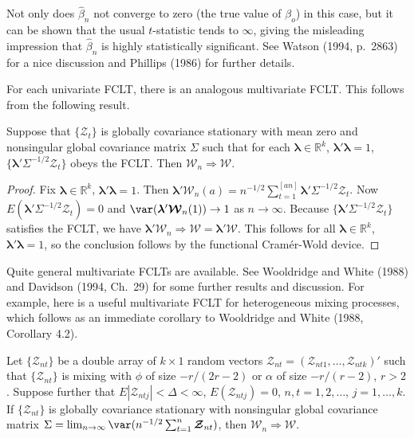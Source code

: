 Not only does $\hat{\beta}_n$ not converge to zero (the true value of $\beta_o$) in this case, but it can be shown that the usual $t$-statistic tends to $\infty$, giving the misleading impression that $\hat{\beta}_n$ is highly statistically significant. See Watson (1994, p.\ 2863) for a nice discussion and Phillips (1986) for further details.

For each univariate FCLT, there is an analogous multivariate FCLT. This follows from the following result.

\begin{theorem}\label{thm:multivariate-fclt}
Suppose that $\{\boldsymbol{\mathcal{Z}}_t\}$ is globally covariance stationary with mean zero and nonsingular global covariance matrix $\Sigma$ such that for each $\boldsymbol{\lambda} \in \mathbb{R}^k$, $\boldsymbol{\lambda}'\boldsymbol{\lambda} = 1$, $\{\boldsymbol{\lambda}'\Sigma^{-1/2}\boldsymbol{\mathcal{Z}}_t\}$ obeys the FCLT. Then $\boldsymbol{\mathcal{W}}_n \Rightarrow \boldsymbol{\mathcal{W}}$.
\end{theorem}

\begin{proof}
Fix $\boldsymbol{\lambda} \in \mathbb{R}^k$, $\boldsymbol{\lambda}'\boldsymbol{\lambda} = 1$. Then $\boldsymbol{\lambda}'\boldsymbol{\mathcal{W}}_n(a) = n^{-1/2}\sum_{t=1}^{[an]} \boldsymbol{\lambda}'\Sigma^{-1/2}\boldsymbol{\mathcal{Z}}_t$. Now $E(\boldsymbol{\lambda}'\Sigma^{-1/2}\boldsymbol{\mathcal{Z}}_t) = 0$ and $\var(\boldsymbol{\lambda}'\boldsymbol{\mathcal{W}}_n(1)) \to 1$ as $n \to \infty$. Because $\{\boldsymbol{\lambda}'\Sigma^{-1/2}\boldsymbol{\mathcal{Z}}_t\}$ satisfies the FCLT, we have $\boldsymbol{\lambda}'\boldsymbol{\mathcal{W}}_n \Rightarrow \mathcal{W} = \boldsymbol{\lambda}'\boldsymbol{\mathcal{W}}$. This follows for all $\boldsymbol{\lambda} \in \mathbb{R}^k$, $\boldsymbol{\lambda}'\boldsymbol{\lambda} = 1$, so the conclusion follows by the functional Cram\'{e}r-Wold device.
\end{proof}

Quite general multivariate FCLTs are available. See Wooldridge and White (1988) and Davidson (1994, Ch.\ 29) for some further results and discussion. For example, here is a useful multivariate FCLT for heterogeneous mixing processes, which follows as an immediate corollary to Wooldridge and White (1988, Corollary 4.2).

\begin{theorem}\label{thm:het-mixing-multi-fclt}
Let $\{\boldsymbol{\mathcal{Z}}_{nt}\}$ be a double array of $k \times 1$ random vectors $\boldsymbol{\mathcal{Z}}_{nt} = (\mathcal{Z}_{nt1}, \ldots, \mathcal{Z}_{ntk})'$ such that $\{\boldsymbol{\mathcal{Z}}_{nt}\}$ is mixing with $\phi$ of size $-r/(2r-2)$ or $\alpha$ of size $-r/(r-2)$, $r > 2$. Suppose further that $E|\mathcal{Z}_{ntj}| < \Delta < \infty$, $E(\mathcal{Z}_{ntj}) = 0$, $n, t = 1, 2, \ldots$, $j = 1, \ldots, k$. If $\{\boldsymbol{\mathcal{Z}}_{nt}\}$ is globally covariance stationary with nonsingular global covariance matrix $\Sigma = \lim_{n\to\infty} \var(n^{-1/2}\sum_{t=1}^{n} \boldsymbol{\mathcal{Z}}_{nt})$, then $\boldsymbol{\mathcal{W}}_n \Rightarrow \boldsymbol{\mathcal{W}}$.
\end{theorem}

